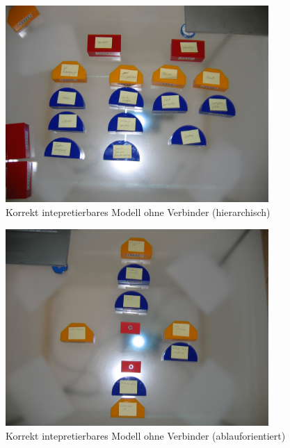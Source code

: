 \begin{figure}[htbp]
	\centering
		\includegraphics[width=10cm]{img/Evaluierung/modell_verbinder_unwichtig1.JPG}
	\caption{Korrekt intepretierbares Modell ohne Verbinder (hierarchisch)}
	\label{fig:img_Evaluierung_modell_verbinder_unwichtig1}
\end{figure}

\begin{figure}[htbp]
	\centering
		\includegraphics[width=10cm]{img/Evaluierung/modell_verbinder_unwichtig2.JPG}
	\caption{Korrekt intepretierbares Modell ohne Verbinder (ablauforientiert)}
	\label{fig:img_Evaluierung_modell_verbinder_unwichtig2}
\end{figure}

